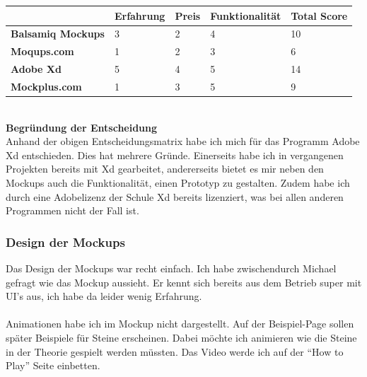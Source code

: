 \documentclass[11pt]{article}
\begin{document}
    \begin{center}
        \begin{tabular}{ | p{4cm} | p{2.5cm} | p{2.5cm} | p{3cm} | p{2.5cm} | }
            \hline
            & \textbf{Erfahrung} & \textbf{Preis} & \textbf{Funktionalität} & \textbf{Total Score} \\ \hline
            \textbf{Balsamiq Mockups} & 3                  & 2              & 4                       & 10                   \\ \hline
            \textbf{Moqups.com}       & 1                  & 2              & 3                       & 6                    \\ \hline
            \textbf{Adobe Xd}         & 5                  & 4              & 5                       & 14                   \\ \hline
            \textbf{Mockplus.com}     & 1                  & 3              & 5                       & 9                    \\ \hline
        \end{tabular}
    \end{center}
    \\
    \textbf{Begründung der Entscheidung}\\
    Anhand der obigen Entscheidungsmatrix habe ich mich für das Programm Adobe Xd entschieden. Dies hat mehrere
    Gründe. Einerseits habe ich in vergangenen Projekten bereits mit Xd gearbeitet, andererseits bietet es
    mir neben den Mockups auch die Funktionalität, einen Prototyp zu gestalten. Zudem habe ich durch eine
    Adobelizenz der Schule Xd bereits lizenziert, was bei allen anderen Programmen nicht der Fall ist.

    \subsubsection{Design der Mockups}
    Das Design der Mockups war recht einfach. Ich habe zwischendurch Michael gefragt wie das Mockup aussieht. Er kennt
    sich bereits aus dem Betrieb super mit UI's aus, ich habe da leider wenig Erfahrung.
    \\\\Animationen habe ich im Mockup nicht dargestellt. Auf der Beispiel-Page sollen später Beispiele für Steine
    erscheinen. Dabei möchte ich animieren wie die Steine in der Theorie gespielt werden müssten.
    Das Video werde ich auf der ``How to Play'' Seite einbetten.
\end{document}

